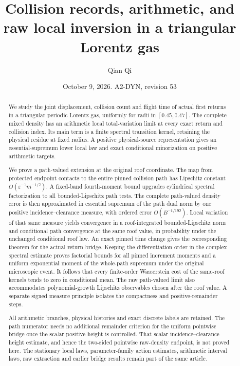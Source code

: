 \documentclass[11pt,reqno]{amsart}
\title[Collision records and raw local inversion]{Collision records, arithmetic, and raw local inversion in a triangular Lorentz gas}
\author{Qian Qi}
\date{October 9, 2026. A2-DYN, revision 53}
\numberwithin{equation}{section}
\theoremstyle{definition}\newtheorem{definition}[theorem]{Definition}
\theoremstyle{remark}\newtheorem{remark}[theorem]{Remark}
\begin{document}
\raggedbottom
\begin{abstract}
We study the joint displacement, collision count and flight time of
actual first returns in a triangular periodic Lorentz gas, uniformly
for radii in $[0.45,0.47]$. The complete mixed density has an arithmetic
local total-variation limit at every exact return and collision index.
Its main term is a finite spectral transition kernel, retaining the
physical residue at fixed radius. A positive physical-source
representation gives an essential-supremum lower local law and exact
conditional minorization on positive arithmetic targets.

We prove a path-valued extension at the original roof coordinate.
The map from protected endpoint contacts to the entire pinned collision
path has Lipschitz constant $O(\varepsilon^{-1}m^{-1/2})$.
A fixed-band fourth-moment bound upgrades cylindrical spectral
factorization to all bounded-Lipschitz path tests. The complete
path-valued density error is then approximated in essential supremum
of the path dual norm by one positive incidence--clearance measure,
with ordered error $O(B^{-1/192})$. Local variation of that same measure
yields convergence in a roof-integrated bounded-Lipschitz norm and
conditional path convergence at the same roof value, in probability
under the unchanged conditional roof law. An exact pinned time change
gives the corresponding theorem for the actual return bridge.
Keeping the differentiation order in the complex spectral estimate
proves factorial bounds for all pinned increment moments and a uniform
exponential moment of the whole-path supremum under the original
microscopic event. It follows that every finite-order Wasserstein
cost of the same-roof kernels tends to zero in conditional mean.
The raw path-valued limit also accommodates polynomial-growth
Lipschitz observables chosen after the roof value. A separate signed
measure principle isolates the compactness and positive-remainder
steps.

All arithmetic branches, physical histories and exact discrete labels
are retained. The path numerator needs no additional remainder
criterion for the uniform pointwise bridge once the scalar positive
height is controlled. That scalar incidence--clearance height estimate,
and hence the two-sided pointwise raw-density endpoint, is not proved
here. The stationary local laws, parameter-family action estimates,
arithmetic interval laws, raw extraction and earlier bridge results
remain part of the same article.
\end{abstract}
\maketitle
\end{document}
